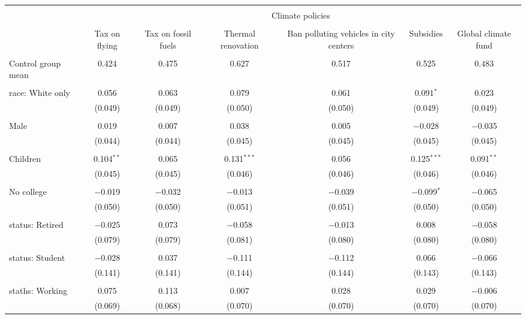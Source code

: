 
\begin{tabular}{@{\extracolsep{5pt}}lcccccc} 
\\[-1.8ex]\hline 
\hline \\[-1.8ex] 
 & \multicolumn{6}{c}{Climate policies} \\ 
\cline{2-7} 
\\[-1.8ex] & Tax on flying & Tax on fossil fuels & Thermal renovation & Ban polluting vehicles in city centers & Subsidies & Global climate fund \\ 
\hline \\[-1.8ex] 
 Control group mean & 0.424 & 0.475 & 0.627 & 0.517 & 0.525 & 0.483  \\ \hline \\[-1.8ex] race: White only & 0.056 & 0.063 & 0.079 & 0.061 & 0.091$^{*}$ & 0.023 \\ 
  & (0.049) & (0.049) & (0.050) & (0.050) & (0.049) & (0.049) \\ 
  & & & & & & \\ 
 Male & 0.019 & 0.007 & 0.038 & 0.005 & $-$0.028 & $-$0.035 \\ 
  & (0.044) & (0.044) & (0.045) & (0.045) & (0.045) & (0.045) \\ 
  & & & & & & \\ 
 Children & 0.104$^{**}$ & 0.065 & 0.131$^{***}$ & 0.056 & 0.125$^{***}$ & 0.091$^{**}$ \\ 
  & (0.045) & (0.045) & (0.046) & (0.046) & (0.046) & (0.046) \\ 
  & & & & & & \\ 
 No college & $-$0.019 & $-$0.032 & $-$0.013 & $-$0.039 & $-$0.099$^{*}$ & $-$0.065 \\ 
  & (0.050) & (0.050) & (0.051) & (0.051) & (0.050) & (0.050) \\ 
  & & & & & & \\ 
 status: Retired & $-$0.025 & 0.073 & $-$0.058 & $-$0.013 & 0.008 & $-$0.058 \\ 
  & (0.079) & (0.079) & (0.081) & (0.080) & (0.080) & (0.080) \\ 
  & & & & & & \\ 
 status: Student & $-$0.028 & 0.037 & $-$0.111 & $-$0.112 & 0.066 & $-$0.066 \\ 
  & (0.141) & (0.141) & (0.144) & (0.144) & (0.143) & (0.143) \\ 
  & & & & & & \\ 
 staths: Working & 0.075 & 0.113 & 0.007 & 0.028 & 0.029 & $-$0.006 \\ 
  & (0.069) & (0.068) & (0.070) & (0.070) & (0.070) & (0.070) \\ 

\end{tabular}
